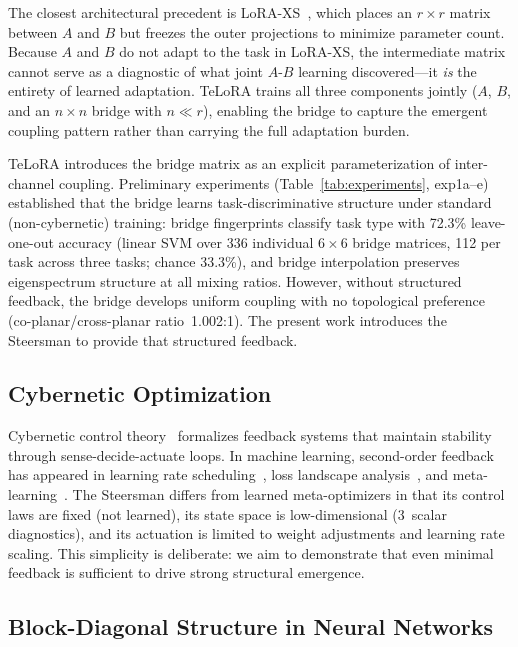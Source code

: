 \documentclass[11pt]{article}
\begin{document}
The closest architectural precedent is
LoRA-XS~\cite{banaei2024loraxs}, which places an $r \times r$ matrix
between $A$ and $B$ but freezes the outer projections to minimize
parameter count. Because $A$ and $B$ do not adapt to the task in
LoRA-XS, the intermediate matrix cannot serve as a diagnostic of what
joint $A$-$B$ learning discovered---it \emph{is} the entirety of
learned adaptation. TeLoRA trains all three components jointly
($A$, $B$, and an $n \times n$ bridge with $n \ll r$), enabling the
bridge to capture the emergent coupling pattern rather than carrying
the full adaptation burden.

TeLoRA introduces the bridge matrix as an explicit
parameterization of inter-channel coupling. Preliminary experiments
(Table~\ref{tab:experiments}, exp1a--e) established that the bridge
learns task-discriminative structure under standard (non-cybernetic)
training: bridge fingerprints classify task type with 72.3\%
leave-one-out accuracy (linear SVM over 336 individual $6 \times 6$
bridge matrices, 112 per task across three tasks; chance 33.3\%),
and bridge interpolation preserves
eigenspectrum structure at all mixing ratios. However, without
structured feedback, the bridge develops uniform coupling with no
topological preference (co-planar/cross-planar ratio~1.002:1). The
present work introduces the Steersman to provide that structured
feedback.

\subsection{Cybernetic Optimization}

Cybernetic control theory~\cite{wiener1948, ashby1956, beer1972}
formalizes feedback systems that maintain stability through
sense-decide-actuate loops. In machine learning, second-order feedback has appeared in
learning rate scheduling~\cite{smith2017cyclical}, loss landscape
analysis~\cite{li2018visualizing}, and
meta-learning~\cite{andrychowicz2016}. The Steersman differs from
learned meta-optimizers in that its control laws are fixed (not
learned), its state space is low-dimensional (3~scalar diagnostics),
and its actuation is limited to weight adjustments and learning rate
scaling. This simplicity is deliberate: we aim to demonstrate that
even minimal feedback is sufficient to drive strong structural
emergence.

\subsection{Block-Diagonal Structure in Neural Networks}
\end{document}
